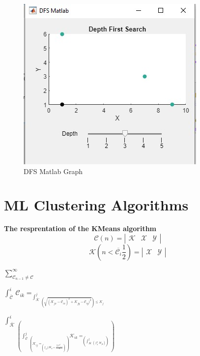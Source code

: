 \documentclass[conference]{IEEEtran}
\begin{document}
      \begin{figure}[ht]
        \centering
        \includegraphics[width=0.65\columnwidth]{Figures/fig3.jpg}
        \caption{DFS Matlab Graph}
        \label{fig:dfsMatlabGraph}
      \end{figure}

    \section{ML Clustering Algorithms}
      \begin{center}
        \textbf{The resprentation of the KMeans algorithm}
        \[ \mathcal{C}(n) = \left| 
          \begin{array}{ccc}
            \mathcal{K} & \mathcal{X} & \mathcal{Y}
          \end{array} \right|
        \]
        \[ \mathcal{K}(n \mathcal{<} \overline{\mathcal{C}_{i}}\frac{1}{2}) = \left|  
          \begin{array}{cc}
            \mathcal{X} & \mathcal{Y}
          \end{array} \right|
        \] 

        $\sum_{\mathcal{C}_{n-1} \neq \mathcal{C}}^{\infty}$

        $\int_{\overline{\mathcal{C}}}^{i} \, \mathcal{C}_{ik}=
            _{\int_{\overline{\mathcal{K}}}^{j}  \,
              _{\left(\sqrt{(\mathcal{K}_{j x} - \mathcal{C}_{i x})^2 + \mathcal{K}_{j y} - \mathcal{C}_{iy})^2 }
              \right) \leq \mathcal{K}_{j}}}$

        $\int_{\overline{\mathcal{K}}}^{i} \,
        _{\left(\int_{\overline{\mathcal{C}}}^{j} \,
        _{\left(
          \mathcal{K}_{ij} =
         _{\left(\int_{2}{j} \, 
         \overline{\mathcal{M}_k} = \frac{\sum \mathcal{C}_{j \equiv i}^k}{n} 
         \right)}
        \right)}
        \mathcal{K}_{ik} =
        _{\left(\int_{\overline{\mathcal{M}}}^{j} \, 
          _{\left(\int_{2}^{k} \, 
            \mathcal{M}_{jk}
          \right)}
          \right)}
        \right)}$
        
      \end{center}
\end{document}
